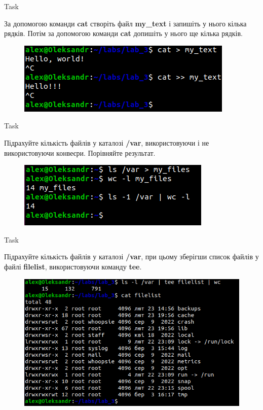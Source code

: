 \documentclass[a4paper,12pt]{article}
\newcommand{\RomanNumeralCaps}[1]{\MakeUppercase{\romannumeral #1}}
\begin{document}
    \begin{center}
        \Large{Task \RomanNumeralCaps{5}}
    \end{center}
    За допомогою команди \textbf{cat} створіть файл \textbf{my\_text} і запишіть у нього кілька рядків. Потім за допомогою команди \textbf{cat} 
    допишіть у нього ще кілька рядків.
    \begin{figure}[h!]
        \begin{minipage}[h]{1\linewidth}
            \centering
            \includegraphics[width=0.5\linewidth]{Prt sc/Figure_5.png}  
        \end{minipage}
    \end{figure}

    \begin{center}
        \Large{Task \RomanNumeralCaps{6}}
    \end{center}
    Підрахуйте кількість файлів у каталозі \textbf{/var}, використовуючи і не використовуючи конвеєри. Порівняйте результат.
    \begin{figure}[h!]
        \begin{minipage}[h]{1\linewidth}
            \centering
            \includegraphics[width=0.5\linewidth]{Prt sc/Figure_6.png}  
        \end{minipage}
    \end{figure}

\newpage
    \begin{center}
        \Large{Task \RomanNumeralCaps{7}}
    \end{center}
    Підрахуйте кількість файлів у каталозі \textbf{/var}, при цьому зберігши список файлів у файлі \textbf{filelist}, використовуючи команду \textbf{tee}.
    \begin{figure}[h!]
        \begin{minipage}[h]{1\linewidth}
            \centering
            \includegraphics[width=0.5\linewidth]{Prt sc/Figure_7.png}  
        \end{minipage}
    \end{figure}
\end{document}
